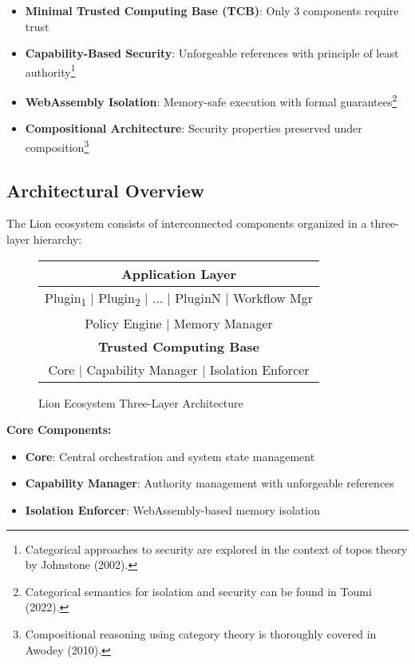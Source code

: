\begin{itemize}
\item \textbf{Minimal Trusted Computing Base (TCB)}: Only 3 components require trust
\item \textbf{Capability-Based Security}: Unforgeable references with principle of least authority\footnote{Categorical approaches to security are explored in the context of topos theory by Johnstone (2002).}
\item \textbf{WebAssembly Isolation}: Memory-safe execution with formal guarantees\footnote{Categorical semantics for isolation and security can be found in Toumi (2022).}
\item \textbf{Compositional Architecture}: Security properties preserved under composition\footnote{Compositional reasoning using category theory is thoroughly covered in Awodey (2010).}
\end{itemize}

\subsection{Architectural Overview}

The Lion ecosystem consists of interconnected components organized in a three-layer hierarchy:

\begin{figure}[h]
\centering
\begin{tabular}{|c|}
\hline
\textbf{Application Layer} \\
\hline
Plugin\textsubscript{1} $|$ Plugin\textsubscript{2} $|$ ... $|$ PluginN $|$ Workflow Mgr \\
\hline
Policy Engine $|$ Memory Manager \\
\hline
\textbf{Trusted Computing Base} \\
\hline
Core $|$ Capability Manager $|$ Isolation Enforcer \\
\hline
\end{tabular}
\caption{Lion Ecosystem Three-Layer Architecture}
\label{fig:lion-architecture}
\end{figure}

\textbf{Core Components:}
\begin{itemize}
\item \textbf{Core}: Central orchestration and system state management
\item \textbf{Capability Manager}: Authority management with unforgeable references
\item \textbf{Isolation Enforcer}: WebAssembly-based memory isolation
\end{itemize}

